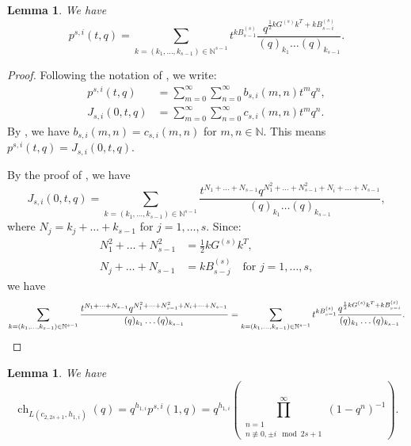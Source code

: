 \documentclass[a4paper, 12pt, reqno]{amsart}
\newtheorem{lemma}[theorem]{Lemma}
\theoremstyle{remark}
\DeclareMathOperator{\ch}{ch}
\begin{document}
\begin{lemma}
  \label{lmm:8}
  We have
  \begin{equation*}
    p^{s, i}(t, q) = \sum_{k = (k_1, \dots, k_{s - 1}) \in \mathbb{N}^{s - 1}}t^{kB^{(s)}_{s - 1}}\frac{q^{\frac{1}{2}kG^{(s)}k^T + kB^{(s)}_{s - i}}}{(q)_{k_1}\dots(q)_{k_{s - 1}}}.
  \end{equation*}
\end{lemma}

\begin{proof}
  Following the notation of \cite[\S7]{andrews_theory_1998}, we write:
  \begin{align*}
    p^{s, i}(t, q) &= \sum_{m = 0}^{\infty}\sum_{n = 0}^{\infty}b_{s, i}(m, n)t^mq^n, \\
    J_{s, i}(0, t, q) &= \sum_{m = 0}^{\infty}\sum_{n = 0}^{\infty}c_{s, i}(m, n)t^mq^n.
  \end{align*}
  By \cite[\S7.3]{andrews_theory_1998}, we have $b_{s, i}(m, n) = c_{s, i}(m, n)$ for $m, n \in \mathbb{N}$.
  This means $p^{s, i}(t, q) = J_{s, i}(0, t, q)$.

  By the proof of \cite[Theorem 7.8]{andrews_theory_1998}, we have
  \begin{equation*}
    J_{s, i}(0, t, q) = \sum_{k = (k_1, \dots, k_{s - 1}) \in \mathbb{N}^{s - 1}}\frac{t^{N_1 + \dots + N_{s - 1}}q^{N_1^2 + \dots + N_{s - 1}^2 + N_i + \dots + N_{s - 1}}}{(q)_{k_1}\dots(q)_{k_{s - 1}}},
  \end{equation*}
  where $N_j = k_j + \dots + k_{s - 1}$ for $j = 1, \dots, s$.
  Since:
  \begin{align*}
    N_1^2 + \dots + N_{s - 1}^2 &= \frac{1}{2}kG^{(s)}k^T, \\
    N_j + \dots + N_{s - 1} &= kB^{(s)}_{s - j} \quad \text{for $j = 1, \dots, s$},
  \end{align*}
  we have
  \begin{equation*}
    \sum_{k = (k_1, \dots, k_{s - 1}) \in \mathbb{N}^{s - 1}}\frac{t^{N_1 + \dots + N_{s - 1}}q^{N_1^2 + \dots + N_{s - 1}^2 + N_i + \dots + N_{s - 1}}}{(q)_{k_1}\dots(q)_{k_{s - 1}}} = \sum_{k = (k_1, \dots, k_{s - 1}) \in \mathbb{N}^{s - 1}}t^{kB^{(s)}_{s - 1}}\frac{q^{\frac{1}{2}kG^{(s)}k^T + kB^{(s)}_{s - i}}}{(q)_{k_1}\dots(q)_{k_{s - 1}}}. \qedhere
  \end{equation*}
\end{proof}

\begin{lemma}
  \label{lmm:9}
  We have
  \begin{equation*}
    \ch_{L(c_{2, 2s + 1}, h_{1, i})}(q) = q^{h_{1, i}}p^{s, i}(1, q) = q^{h_{1, i}}\left(\prod^{\infty}_{\substack{n = 1 \\ n \not\equiv 0, \pm i \mod 2s + 1}}(1 - q^n)^{-1}\right).
  \end{equation*}
\end{lemma}
\end{document}
